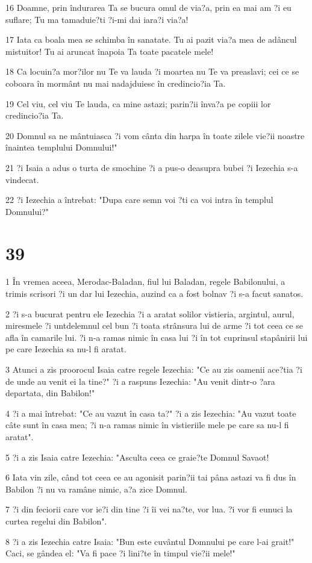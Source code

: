 \par 16 Doamne, prin îndurarea Ta se bucura omul de via?a, prin ea mai am ?i eu suflare; Tu ma tamaduie?ti ?i-mi dai iara?i via?a!
\par 17 Iata ca boala mea se schimba în sanatate. Tu ai pazit via?a mea de adâncul mistuitor! Tu ai aruncat înapoia Ta toate pacatele mele!
\par 18 Ca locuin?a mor?ilor nu Te va lauda ?i moartea nu Te va preaslavi; cei ce se coboara în mormânt nu mai nadajduiesc în credincio?ia Ta.
\par 19 Cel viu, cel viu Te lauda, ca mine astazi; parin?ii înva?a pe copiii lor credincio?ia Ta.
\par 20 Domnul sa ne mântuiasca ?i vom cânta din harpa în toate zilele vie?ii noastre înaintea templului Domnului!"
\par 21 ?i Isaia a adus o turta de smochine ?i a pus-o deasupra bubei ?i Iezechia s-a vindecat.
\par 22 ?i Iezechia a întrebat: "Dupa care semn voi ?ti ca voi intra în templul Domnului?"

\chapter{39}

\par 1 În vremea aceea, Merodac-Baladan, fiul lui Baladan, regele Babilonului, a trimis scrisori ?i un dar lui Iezechia, auzind ca a fost bolnav ?i s-a facut sanatos.
\par 2 ?i s-a bucurat pentru ele Iezechia ?i a aratat solilor vistieria, argintul, aurul, miresmele ?i untdelemnul cel bun ?i toata strânsura lui de arme ?i tot ceea ce se afla în camarile lui. ?i n-a ramas nimic în casa lui ?i în tot cuprinsul stapânirii lui pe care Iezechia sa nu-l fi aratat.
\par 3 Atunci a zis proorocul Isaia catre regele Iezechia: "Ce au zis oamenii ace?tia ?i de unde au venit ei la tine?" ?i a raspuns Iezechia: "Au venit dintr-o ?ara departata, din Babilon!"
\par 4 ?i a mai întrebat: "Ce au vazut în casa ta?" ?i a zis Iezechia: "Au vazut toate câte sunt în casa mea; ?i n-a ramas nimic în vistieriile mele pe care sa nu-l fi aratat".
\par 5 ?i a zis Isaia catre Iezechia: "Asculta ceea ce graie?te Domnul Savaot!
\par 6 Iata vin zile, când tot ceea ce au agonisit parin?ii tai pâna astazi va fi dus în Babilon ?i nu va ramâne nimic, a?a zice Domnul.
\par 7 ?i din feciorii care vor ie?i din tine ?i îi vei na?te, vor lua. ?i vor fi eunuci la curtea regelui din Babilon".
\par 8 ?i a zis Iezechia catre Isaia: "Bun este cuvântul Domnului pe care l-ai grait!" Caci, se gândea el: "Va fi pace ?i lini?te în timpul vie?ii mele!"

